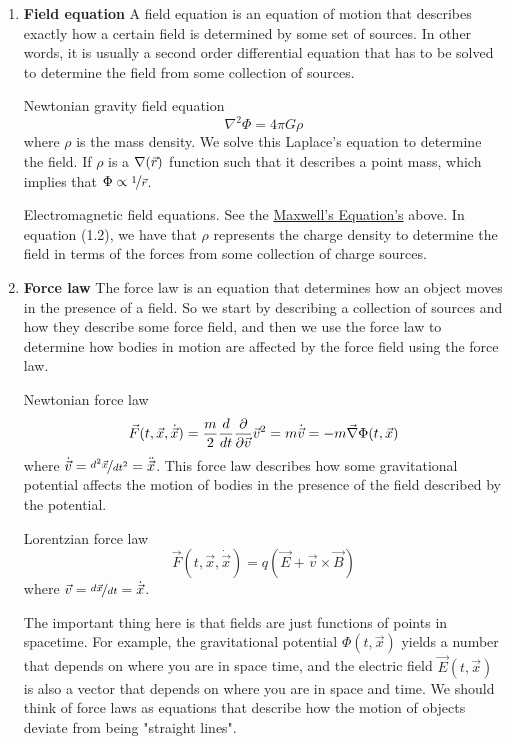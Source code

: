 \documentclass{article}
\begin{document}
 		\begin{enumerate}
 			\item \textbf{Field equation}
 				\subitem A field equation is an equation of motion that describes exactly how a certain field is determined by some set of sources. In other words, it is usually a second order differential equation that has to be solved to determine the field from some collection of sources. 
 			\begin{exmp}
 				Newtonian gravity field equation
 				$$ \nabla^2 \Phi = 4\pi G \rho$$
 				where $\rho$ is the mass density. We solve this Laplace's equation to determine the field. If $\rho$ is a $\nabla(\vec{r})$ function such that it describes a point mass, which implies that
 				$\Phi \propto \nicefrac{1}{\vec{r}}$.
 			\end{exmp}
 		\pagebreak
	 		\begin{exmp}
	 			Electromagnetic field equations. See the \hyperref[eq:Maxwell]{Maxwell's Equation's} above. In equation (1.2), we have that $\rho$ represents the charge density to determine the field in terms of the forces from some collection of charge sources.
	 		\end{exmp}
 			\item \textbf{Force law}
 			\subitem The force law is an equation that determines how an object moves in the presence of a field. So we start by describing a collection of sources and how they describe some force field, and then we use the force law to determine how bodies in motion are affected by the force field using the force law.
 			\begin{exmp}
 				Newtonian force law
 				$$ \vec{F}(t, \vec{x}, \dot{\vec{x}}) = \frac{m}{2}\frac{d}{dt} \frac{\partial}{\partial \vec{v}}\vec{v}^2 = m \dot{\vec{v}} =- m \vec{\nabla} \Phi(t,\vec{x}) $$
 				where $\dot{\vec{v}} = \nicefrac{d^2 \vec{x}}{dt^2} = \ddot{\vec{x}}$. This force law describes how some gravitational potential affects the motion of bodies in the presence of the field described by the potential.
 			\end{exmp}
 			\begin{exmp}
 				Lorentzian force law
 				$$ \vec{F} \left(t, \vec{x}, \dot{\vec{x}}\right)=q (\vec{E} + \vec{v} \times \vec{B} )$$
 				where $\vec{v} = \nicefrac{d\vec{x}}{dt} = \dot{\vec{x}}$.
 			\end{exmp}
 			The important thing here is that fields are just functions of points in spacetime. For example, the gravitational potential $\Phi (t, \vec{x})$ yields a number that depends on where you are in space time, and the electric field $\vec{E} (t, \vec{x})$ is also a vector that depends on where you are in space and time. We should think of force laws as equations that describe how the motion of objects deviate from being "straight lines". 
 		\end{enumerate}
\end{document}
